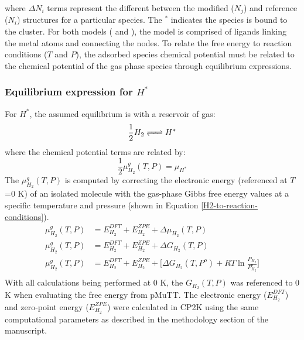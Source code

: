 \documentclass[12pt]{article}
\begin{document}
where $\Delta N_{i}$ terms represent the different between the modified ($N_{j}$) and reference ($N_{i}$) structures for a particular species. The $^{*}$ indicates the species is bound to the cluster. For both models ( and ), the model is comprised of  ligands linking the metal atoms and connecting the  nodes. To relate the free energy to reaction conditions ($T$ and $P$), the adsorbed species chemical potential must be related to the chemical potential of the gas phase species through equilibrium expressions. \\ 

\subsubsection{Equilibrium expression for $H^{*}$}
For $H^{*}$, the assumed equilibrium is with a reservoir of  gas:
\begin{equation}
    \frac{1}{2} H_{2} \ce{<=>} H^{*}
\end{equation}
where the chemical potential terms are related by: 
\begin{equation}
    \frac{1}{2} \mu_{H_{2}}^{g}(T,P) = \mu_{H^{*}}
\end{equation}  
The $\mu_{H_{2}}^{g}(T,P)$ is computed by  correcting the electronic energy (referenced at $T$=0 K) of an isolated molecule with the gas-phase Gibbs free energy values at a specific temperature and pressure (shown in Equation \ref{H2-to-reaction-conditions}). 
\begin{equation}
    \begin{split}
         \mu_{H_{2}}^{g}(T,P) &= E_{H_{2}}^{DFT} + E_{H_{2}}^{ZPE} + \Delta \mu_{H_{2}}(T,P)  \\
         \mu_{H_{2}}^{g}(T,P) &= E_{H_{2}}^{DFT} + E_{H_{2}}^{ZPE} + \Delta G_{H_{2}}(T,P) \\ 
         \mu_{H_{2}}^{g}(T,P) &= E_{H_{2}}^{DFT} + E_{H_{2}}^{ZPE} + \Big[ \Delta G_{H_{2}}(T,P^{o})  + RT \ln{ \frac{P_{H_2}}{P_{H_2}^{o}}} \Big]  \\ 
    \end{split}
    \label{H2-to-reaction-conditions}
\end{equation}
With all calculations being performed at 0 K, the $G_{H_{2}}(T,P)$ was referenced to 0 K when evaluating the free energy from pMuTT. The electronic energy ($E_{H_{2}}^{DFT}$) and zero-point energy ($E_{H_{2}}^{ZPE}$) were calculated in CP2K using the same computational parameters as described in the methodology section of the manuscript. 
\end{document}
